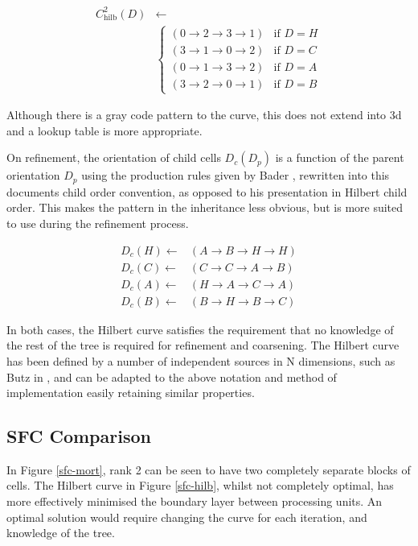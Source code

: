 \documentclass{IIBproject}
\begin{document}
\begin{align}
	C_{\mathrm{hilb}}^2\left(D\right) &\gets \\
	& \begin{cases}
		\left( 0 \to 2 \to 3 \to 1\right) & \text{if }D=H \\
		\left( 3 \to 1 \to 0 \to 2\right) & \text{if }D=C \\
		\left( 0 \to 1 \to 3 \to 2\right) & \text{if }D=A \\
		\left( 3 \to 2 \to 0 \to 1\right) & \text{if }D=B
		\end{cases} \nonumber
\end{align}

Although there is a gray code pattern to the curve, this does not extend into 3d and a lookup table is more appropriate.

On refinement, the orientation of child cells $D_c(D_p)$ is a function of the parent orientation $D_p$ using the production rules given by Bader \cite{bader2013}, rewritten into this documents child order convention, as opposed to his presentation in Hilbert child order. This makes the pattern in the inheritance less obvious, but is more suited to use during the refinement process.

\begin{align}
	D_c(H) \gets& \left( A \to B \to H \to H \right) \\
	D_c(C) \gets& \left( C \to C \to A \to B \right) \\
	D_c(A) \gets& \left( H \to A \to C \to A \right) \\
	D_c(B) \gets& \left( B \to H \to B \to C \right)
\end{align}


In both cases, the Hilbert curve satisfies the requirement that no knowledge of the rest of the tree is required for refinement and coarsening. The Hilbert curve has been defined by a number of independent sources in N dimensions, such as Butz in \cite{butz71}, and can be adapted to the above notation and method of implementation easily retaining similar properties. 

\subsection{SFC Comparison}

In Figure \ref{sfc-mort}, rank 2 can be seen to have two completely separate blocks of cells. The Hilbert curve in Figure \ref{sfc-hilb}, whilst not completely optimal, has more effectively minimised the boundary layer between processing units. An optimal solution would require changing the curve for each iteration, and knowledge of the tree. 
\end{document}

